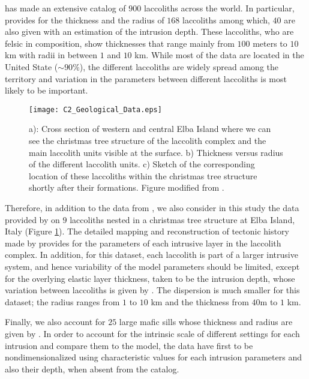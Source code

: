 \citet{E:2015tl}  has made  an extensive  catalog of  $900$ laccoliths
across the  world.  In  particular, \citet{E:2015tl} provides  for the
thickness and  the radius  of $168$ laccoliths  among which,  $40$ are
also  given  with  an  estimation   of  the  intrusion  depth.   These
laccoliths, who are felsic in composition, show thicknesses that range
mainly from $100$ meters to $10$ km with radii in between $1$ and $10$
km.   While  most  of  the  data  are  located  in  the  United  State
($\sim 90\%$),  the different laccoliths  are widely spread  among the
territory and variation in the parameters between different laccoliths
is most likely to be important.
\begin{figure}[h!]
  \begin{center}
    \graphicspath{ {/Users/thorey/Documents/These/Manuscript/Figure/Chapter2/} }
    \texttt{[image: C2\_Geological\_Data.eps]}
    \caption{a):  Cross section  of  western and  central Elba  Island
      where we can  see the christmas tree structure  of the laccolith
      complex and the main laccolith  units visible at the surface. b)
      Thickness  versus radius  of the  different laccolith  units. c)
      Sketch of the corresponding  location of these laccoliths within
      the    christmas   tree    structure    shortly   after    their
      formations. Figure modified from \citet{Rocchi:2002jy}.}
    \label{C2_Geological_Data}
  \end{center}
\end{figure}

Therefore,  in addition  to the  data from  \citet{E:2015tl}, we  also
consider in this  study the data provided  by \citet{Rocchi:2002jy} on
$9$ laccoliths  nested in a  christmas tree structure at  Elba Island,
Italy  (Figure \ref{C2_Geological_Data}).   The  detailed mapping  and
reconstruction  of  tectonic  history  made  by  \citet{Rocchi:2002jy}
provides for the  parameters of each intrusive layer  in the laccolith
complex. In  addition, for this dataset,  each laccolith is part  of a
larger intrusive system, and hence variability of the model parameters
should be limited,  except for the overlying  elastic layer thickness,
taken to be the intrusion depth, whose variation between laccoliths is
given by  \citet{Rocchi:2002jy}.  The  dispersion is much  smaller for
this dataset; the radius ranges from  $1$ to $10$ km and the thickness
from $40$m to $1$ km.

Finally, we  also account for  $25$ large mafic sills  whose thickness
and radius are given by \citet{Cruden:tg}. In order to account for the
intrinsic scale of  different settings for each  intrusion and compare
them to the model, the data  have first to be nondimensionalized using
characteristic  values for  each intrusion  parameters and  also their
depth, when absent from the catalog.


